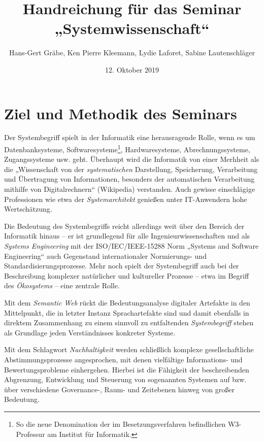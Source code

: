 \documentclass[11pt,a4paper]{article}
\title{Handreichung für das Seminar „Systemwissenschaft“}
\author{Hans-Gert Gr\"abe, Ken Pierre Kleemann, Lydie Laforet, Sabine
  Lautenschläger}
\date{12. Oktober 2019}
\begin{document}
\maketitle

\section{Ziel und Methodik des Seminars}

Der Systembegriff spielt in der Informatik eine herausragende Rolle, wenn es
um Datenbanksysteme, Softwaresysteme\footnote{So die neue Denomination der im
  Besetzungsverfahren befindlichen W3-Professur am Institut für Informatik.},
Hardwaresysteme, Abrechnungssysteme, Zugangssysteme usw. geht.  Überhaupt wird
die Informatik von einer Merhheit als die „Wissenschaft von der
\emph{systematischen} Darstellung, Speicherung, Verarbeitung und Übertragung
von Informationen, besonders der automatischen Verarbeitung mithilfe von
Digitalrechnern“ (Wikipedia) verstanden.  Auch gewisse einschlägige
Professionen wie etwa der \emph{Systemarchitekt} genießen unter IT-Anwendern
hohe Wertschätzung.

Die Bedeutung des Systembegriffs reicht allerdings weit über den Bereich der
Informatik hinaus -- er ist grundlegend für alle Ingenieurwissenschaften und
als \emph{Systems Engineering} mit der ISO/IEC/IEEE-15288 Norm „Systems and
Software Engineering“ auch Gegenstand internationaler Normierungs- und
Standardisierungsprozesse.  Mehr noch spielt der Systembegriff auch bei der
Beschreibung komplexer natürlicher und kultureller Prozesse -- etwa im Begriff
des \emph{Ökosystems} -- eine zentrale Rolle.

Mit dem \emph{Semantic Web} rückt die Bedeutungsanalyse digitaler Artefakte in
den Mittelpunkt, die in letzter Instanz Sprachartefakte sind und damit
ebenfalls in direktem Zusammenhang zu einem sinnvoll zu entfaltenden
\emph{Systembegriff} stehen als Grundlage jeden Verständnisses konkreter
Systeme.

Mit dem Schlagwort \emph{Nachhaltigkeit} werden schließlich komplexe
gesellschaftliche Abstimmungsprozesse angesprochen, mit denen vielfältige
Informations- und Bewertungsprobleme einhergehen. Hierbei ist die Fähigkeit
der beschreibenden Abgrenzung, Entwicklung und Steuerung von sogenannten
Systemen auf bzw. über verschiedene Governance-, Raum- und Zeitebenen hinweg
von großer Bedeutung.
\end{document}

